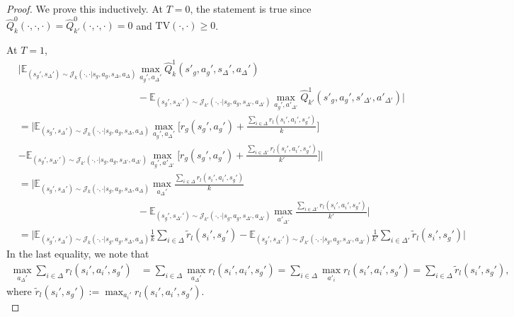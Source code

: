 \documentclass{article}
\theoremstyle{plain}
\theoremstyle{definition}
\def\E{\mathbb{E}}
\begin{document}
\begin{proof}
We prove this inductively. At $T=0$, the statement is true since $\hat{Q}_k^0(\cdot,\cdot,\cdot) = \hat{Q}_{k'}^0(\cdot,\cdot,\cdot) = 0$ and $\mathrm{TV}(\cdot,\cdot)\geq 0$. 

At $T=1$,
\begin{align*}
&\bigg|\E_{(s_g',s_\Delta')\sim\mathcal{J}_k(\cdot,\cdot|s_g,a_g,s_\Delta,a_\Delta)}\max_{a_g',a_\Delta'}\hat{Q}_k^1(s'_g,a_g',s_\Delta',a_\Delta') \\ &\quad\quad\quad\quad\quad\quad\quad\quad\quad\quad\quad\quad- \E_{(s_g',s_{\Delta'}')\sim\mathcal{J}_{k'}(\cdot,\cdot|s_g,a_g,s_{\Delta'}, a_{\Delta'})}\max_{a_g',a'_{\Delta'}}\hat{Q}_{k'}^1(s'_g, a_g',s'_{\Delta'},a'_{\Delta'})\bigg| \\
&=\bigg|\E_{(s_g',s_\Delta')\sim\mathcal{J}_k(\cdot,\cdot|s_g,a_g,s_\Delta,a_\Delta)}\max_{a_g',a_\Delta'}\bigg[r_g(s_g',a_g') + \frac{\sum_{i\in\Delta}r_l(s_i',a_i',s_g')}{k}\bigg] \\
&- \E_{(s_g',s_{\Delta'}')\sim\mathcal{J}_{k'}(\cdot,\cdot|s_g,a_g,s_{\Delta'}, a_{\Delta'})}\max_{a_g',a'_{\Delta'}}\bigg[r_g(s_g',a_g') + \frac{\sum_{i\in\Delta'}r_l(s_i',a_i',s_g')}{k'}\bigg]\bigg|\end{align*}\begin{align*}&= \bigg|\E_{(s_g',s_\Delta')\sim\mathcal{J}_k(\cdot,\cdot|s_g,a_g,s_\Delta,a_\Delta)}\!\max_{a_\Delta'}\frac{\sum_{i\in\Delta}r_l(s_i',a_i',s_g')}{k}\\ &\quad\quad\quad\quad\quad\quad\quad\quad\quad\quad\quad\quad- \E_{(s_g',s_{\Delta'}')\sim\mathcal{J}_{k'}(\cdot,\cdot|s_g,a_g,s_{\Delta'}, a_{\Delta'})}\max_{a'_{\Delta'}}\frac{\sum_{i\in\Delta'}r_l(s_i',a_i',s_g')}{k'}\bigg|\\
&=\bigg|\E_{(s_g',s_\Delta')\sim\mathcal{J}_k(\cdot,\cdot|s_g,a_g,s_\Delta,a_\Delta)}\frac{1}{k}\sum_{i\in\Delta}\tilde{r}_l(s_i',s_g')- \E_{(s_g',s_{\Delta'}')\sim\mathcal{J}_{k'}(\cdot,\cdot|s_g,a_g,s_{\Delta'}, a_{\Delta'})}\frac{1}{k'}\sum_{i\in\Delta'}\tilde{r}_l(s_i',s_g')\bigg|
\end{align*}
In the last equality, we note that \begin{align*}\max_{a_\Delta'}\sum_{i\in\Delta}r_l(s_i',a_i',s_g') &= \sum_{i\in\Delta}\max_{a_\Delta'} r_l(s_i',a_i',s_g') = \sum_{i\in\Delta}\max_{a'_i} r_l(s_i',a_i',s_g') = \sum_{i\in\Delta}\tilde{r}_l(s_i',s_g'),\end{align*}where $\tilde{r}_l(s_i',s_g'):=\max_{a_i'}r_l(s_i',a_i',s_g')$. \\


\end{proof}
\end{document}
